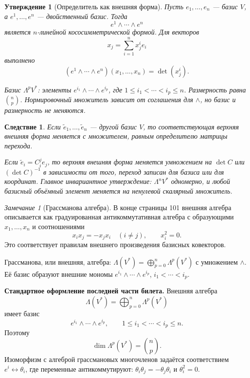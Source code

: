 \documentclass[12pt,a4paper]{article}
\theoremstyle{definition}
\theoremstyle{plain}
\newtheorem{proposition}[definition]{Утверждение}
\newtheorem{corollary}[definition]{Следствие}
\theoremstyle{remark}
\newtheorem{remark}[definition]{Замечание}
\newenvironment{planadd}{\begin{planbox}}{\end{planbox}}
\newenvironment{knowledgefix}{\begin{clarifybox}}{\end{clarifybox}}
\begin{document}
\begin{proposition}[Определитель как внешняя форма]
Пусть $e_1,\ldots,e_n$ --- базис $V$, а $e^1,\ldots,e^n$ --- двойственный базис. Тогда
\[
    e^1\wedge\cdots\wedge e^n
\]
является $n$-линейной кососимметрической формой. Для векторов
\[
    x_j=\sum_{i=1}^{n}x^i_j e_i
\]
выполнено
\[
    (e^1\wedge\cdots\wedge e^n)(x_1,\ldots,x_n)
    =
    \det(x^i_j).
\]
\begin{knowledgefix}
Базис \(\Lambda^p V^*\): элементы \(e^{i_1}\wedge\cdots\wedge e^{i_p}\), где \(1\le i_1<\cdots<i_p\le n\). Размерность равна \(\binom np\). Нормировочный множитель зависит от соглашения для \(\wedge\), но базис и размерность не меняются.
\end{knowledgefix}
\end{proposition}

\begin{corollary}
Если $\tilde e_1,\ldots,\tilde e_n$ --- другой базис $V$, то соответствующая верхняя внешняя форма меняется с множителем, равным определителю матрицы перехода.
\begin{knowledgefix}
Если \(\tilde e_i=C^j_i e_j\), то верхняя внешняя форма меняется умножением на \(\det C\) или \((\det C)^{-1}\) в зависимости от того, переход записан для базиса или для координат. Главное инвариантное утверждение: \(\Lambda^n V^*\) одномерно, и любой базисный объёмный элемент меняется на ненулевой скалярный множитель.
\end{knowledgefix}
\end{corollary}

\begin{remark}[Грассманова алгебра]
В конце страницы 101 внешняя алгебра описывается как градуированная антикоммутативная алгебра с образующими $x_1,\ldots,x_n$ и соотношениями
\[
    x_i x_j=-x_j x_i\quad (i\ne j),
    \qquad
    x_i^2=0.
\]
Это соответствует правилам внешнего произведения базисных ковекторов.
\begin{knowledgefix}
Грассманова, или внешняя, алгебра: \(\Lambda(V^*)=\bigoplus_{p=0}^n\Lambda^p(V^*)\) с умножением \(\wedge\). Её базис образуют внешние мономы \(e^{i_1}\wedge\cdots\wedge e^{i_p}\), \(i_1<\cdots<i_p\).
\end{knowledgefix}
\end{remark}
\begin{planadd}
\textbf{Стандартное оформление последней части билета.}
Внешняя алгебра
\[
    \Lambda(V^*)=\bigoplus_{p=0}^{n}\Lambda^p(V^*)
\]
имеет базис
\[
    e^{i_1}\wedge\cdots\wedge e^{i_p}, \qquad 1\le i_1<\cdots<i_p\le n.
\]
Поэтому
\[
    \dim \Lambda^p(V^*)=\binom np.
\]
Изоморфизм с алгеброй грассмановых многочленов задаётся соответствием
$e^i\leftrightarrow \theta_i$, где переменные антикоммутируют:
$\theta_i\theta_j=-\theta_j\theta_i$ и $\theta_i^2=0$.
\end{planadd}

\clearpage
\end{document}
